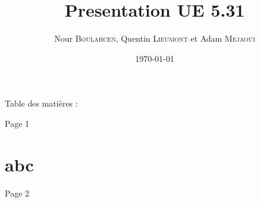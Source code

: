 \documentclass{beamer}
\title{Presentation UE 5.31}
\author{
    Nour \textsc{Boulahcen},
    Quentin \textsc{Lieumont} et
    Adam \textsc{Mejaoui}
}
\institute{Institut Villebon Georges \textsc{Charpak}}
\date{\today}
\begin{document}
\begin{frame}
    \titlepage
\end{frame}

\begin{frame}{Table des matières :}
    \tableofcontents
\end{frame}

\begin{frame}{Page 1\section{abc}\label{sec:abc}}

\end{frame}

\begin{frame}{Page 2}
\end{frame}
\end{document}
